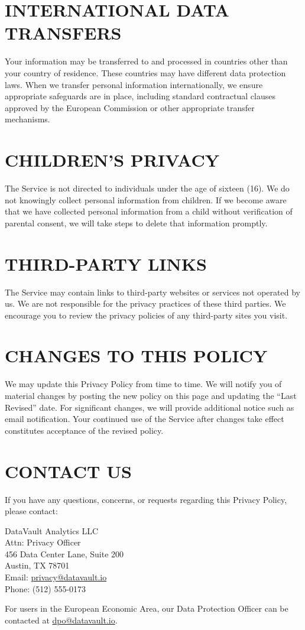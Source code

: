 \documentclass[
    language=english,
    doctype=privacy-policy,
    institution=none,
]{../../omnilatex}
\begin{document}
\section{INTERNATIONAL DATA TRANSFERS}

Your information may be transferred to and processed in countries other than your country of residence. These countries may have different data protection laws. When we transfer personal information internationally, we ensure appropriate safeguards are in place, including standard contractual clauses approved by the European Commission or other appropriate transfer mechanisms.

\section{CHILDREN'S PRIVACY}

The Service is not directed to individuals under the age of sixteen (16). We do not knowingly collect personal information from children. If we become aware that we have collected personal information from a child without verification of parental consent, we will take steps to delete that information promptly.

\section{THIRD-PARTY LINKS}

The Service may contain links to third-party websites or services not operated by us. We are not responsible for the privacy practices of these third parties. We encourage you to review the privacy policies of any third-party sites you visit.

\section{CHANGES TO THIS POLICY}

We may update this Privacy Policy from time to time. We will notify you of material changes by posting the new policy on this page and updating the ``Last Revised'' date. For significant changes, we will provide additional notice such as email notification. Your continued use of the Service after changes take effect constitutes acceptance of the revised policy.

\section{CONTACT US}

If you have any questions, concerns, or requests regarding this Privacy Policy, please contact:

DataVault Analytics LLC\\
Attn: Privacy Officer\\
456 Data Center Lane, Suite 200\\
Austin, TX 78701\\
Email: \url{privacy@datavault.io}\\
Phone: (512) 555-0173

For users in the European Economic Area, our Data Protection Officer can be contacted at \url{dpo@datavault.io}.
\end{document}
